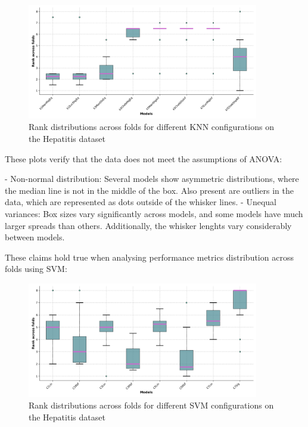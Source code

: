 \begin{figure}[!ht]
    \centering
    \includegraphics[width=0.9\textwidth]{figures/ranked_folds_KNN_hepatitis.png}
    \caption{Rank distributions across folds for different KNN configurations on the Hepatitis dataset}
\label{fig:ranked-folds-knn-hepatitis}
\end{figure}

These plots verify that the data does not meet the assumptions of ANOVA:

- Non-normal distribution: Several models show asymmetric distributions, where the median line is not in the middle of the box.
Also present are outliers in the data, which are represented as dots outside of the whisker lines.
- Unequal variances: Box sizes vary significantly across models, and some models have much larger spreads than others.
Additionally, the whisker lenghts vary considerably between models.

These claims hold true when analysing performance metrics distribution across folds using SVM:

\begin{figure}[!ht]
    \centering
    \includegraphics[width=0.9\textwidth]{figures/ranked_folds_SVM_hepatitis.png}
    \caption{Rank distributions across folds for different SVM configurations on the Hepatitis dataset}
\label{fig:ranked-folds-svm-hepatitis}
\end{figure}

